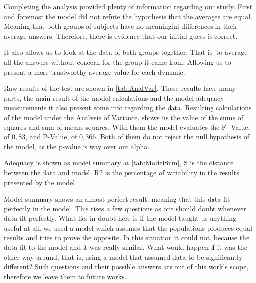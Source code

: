 Completing the analysis provided plenty of information regarding our study. First and foremost the model did not refute the hypothesis that the averages are equal. Meaning that both groups of subjects have no meaningful differences in their average answers. Therefore, there is evidence that our initial guess is correct. 

It also allows us to look at the data of both groups together. That is, to average all the answers without concern for the group it came from. Allowing us to present a more trustworthy average value for each dynamic. 



Raw results of the test are shown in \ref{tab:AnalVar}. Those results have many parts, the main result of the model calculations and the model adequacy measurements it also present some info regarding the data. Resulting calculations of the model under the Analysis of Variance, shows us the value of the sums of squares and sum of means squares. With them the model evaluates the F- Value, of $0,83$, and P-Value, of $0,366$. Both of them do not reject the null hypothesis of the model, as the p-value is way over our alpha. 

Adequacy is shown as model summary at \ref{tab:ModelSum}, S is the distance between the data and model, R2 is the percentage of variability in the results presented by the model.

Model summary shows an almost perfect result, meaning that this data fit perfectly in the model. This rises a few questions as one should doubt whenever data fit perfectly. What lies in doubt here is if the model taught us anything useful at all, we used a model which assumes that the populations produces equal results and tries to prove the opposite. In this situation it could not, because the data fit to the model and it was really similar. What would happen if it was the other way around, that is, using a model that assumed data to be significantly different? Such questions and their possible answers are out of this work's scope, therefore we leave them to future works.